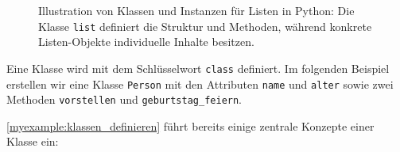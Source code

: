 \begin{figure}[H]
\caption{Illustration von Klassen und Instanzen für Listen in Python: Die Klasse \texttt{list} definiert die Struktur und Methoden, während konkrete Listen-Objekte individuelle Inhalte besitzen.}
\label{fig:listen-in-python}
\end{figure}


\begin{myexample}\label{myexample:klassen_definieren}
Eine Klasse wird mit dem Schlüsselwort \lstinline|class| definiert. Im folgenden Beispiel erstellen wir eine Klasse \lstinline|Person| mit den Attributen \lstinline|name| und \lstinline|alter| sowie zwei Methoden \lstinline|vorstellen| und \lstinline|geburtstag_feiern|.


\end{myexample}

\cref{myexample:klassen_definieren} führt bereits einige zentrale Konzepte einer Klasse ein:

